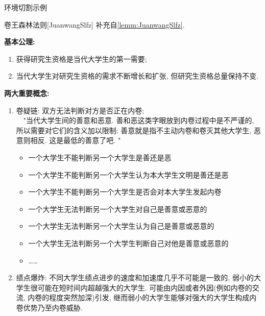 \begin{frame}[t,allowframebreaks]{环境切割示例}
	\begin{scuremark}{卷王森林法则}[JuanwangSlfz]
		补充自\vref{lemm:JuanwangSlfz}.\par
		\textbf{\color{scured}基本公理:}
		\begin{enumerate}
			\item 获得研究生资格是当代大学生的第一需要;
			\item 当代大学生对研究生资格的需求不断增长和扩张, 但研究生资格总量保持不变.
		\end{enumerate}
		\textbf{\color{scured}两大重要概念:}
		\begin{enumerate}
			\item 卷疑链: 双方无法判断对方是否正在内卷;\\
			~~"当代大学生间的善意和恶意. 善和恶这类字眼放到内卷过程中是不严谨的, 所以需要对它们的含义加以限制: 善意就是指不主动内卷和卷灭其他大学生, 恶意则相反. 这是最低的善意了吧. "
			\begin{itemize}
				\item 一个大学生不能判断另一个大学生是善还是恶
				\item 一个大学生不能判断另一个大学生认为本大学生文明是善还是恶
				\item 一个大学生不能判断另一个大学生是否会对本大学生发起内卷
				\item 一个大学生无法判断另一个大学生对自己是善意或恶意的
				\item 一个大学生无法判断另一个大学生认为自己是善意或恶意的
				\item 一个大学生无法判断另一个大学生判断自己对他是善意或恶意的
				\item \dots\dots
			\end{itemize}
			\item 绩点爆炸: 不同大学生绩点进步的速度和加速度几乎不可能是一致的, 弱小的大学生很可能在短时间内超越强大的大学生. 可能由内因或者外因(例如内卷的交流, 内卷的程度突然加深)引发, 继而弱小的大学生能够对强大的大学生构成内卷优势乃至内卷威胁.
		\end{enumerate}
	\end{scuremark}
\end{frame}

